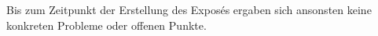 Bis zum Zeitpunkt der Erstellung des Exposés ergaben sich ansonsten keine konkreten Probleme oder offenen Punkte.